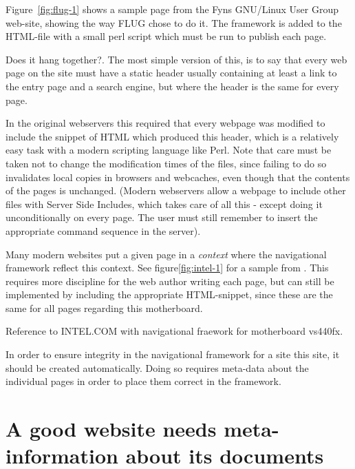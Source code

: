 
Figure~\vref{fig:flug-1} shows a sample page from the Fyns GNU/Linux
User Group web-site, showing the way FLUG chose to do it.  The
framework is added to the HTML-file with a small perl script which
must be run to publish each page.

\textsf{Does it hang together?}.
The most simple version of this, is to say that every web page on the
site must have a static header usually containing at least a link to the entry
page and a search engine, but where the header is the same for every
page.

In the original webservers this required that every webpage was
modified to include the snippet of HTML which produced this header,
which is a relatively easy task with a modern scripting language like
Perl.  Note that care must be taken not to change the modification times of the
files, since failing to do so invalidates local copies in browsers
and webcaches, even though that the contents of the pages \textsf{is}
unchanged.  (Modern webservers allow a webpage to include other files
with \textsf{Server Side Includes}, which takes care of all this - except
doing it unconditionally on every page.  The user must still remember
to insert the appropriate command sequence in the server).

%
%
Many modern websites put a given page in a
\textit{context} where the navigational framework reflect this
context.  See figure\vref{fig:intel-1} for a sample from
.  This requires more discipline
for the web author writing each page, but can still be implemented by
including the appropriate HTML-snippet, since these are the same for
all pages regarding this motherboard.

\textsf{Reference to INTEL.COM with navigational fraework for
  motherboard vs440fx}.

In order to ensure integrity in the navigational framework for a site
this site, it should be created automatically.  Doing so requires
meta-data about the individual pages in order to place them correct in
the framework.

\section{A good website needs meta-information about its documents}

